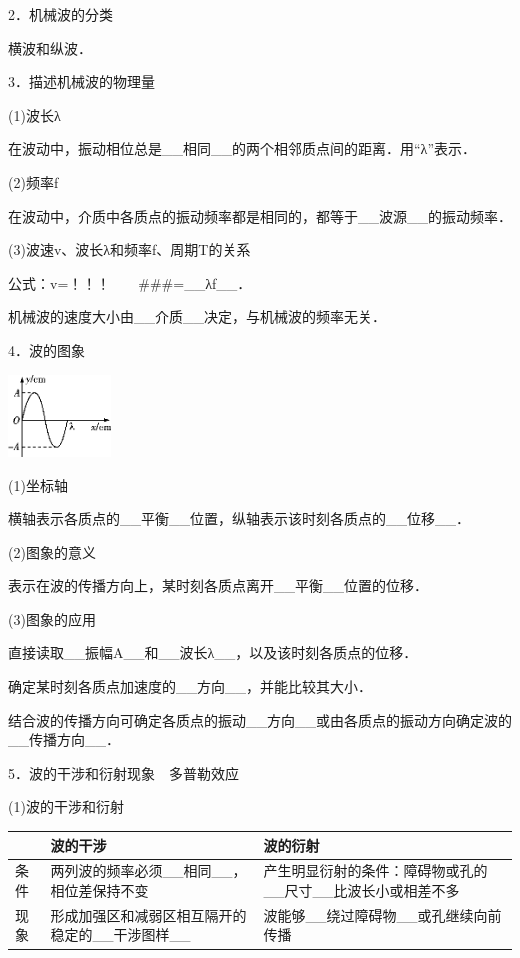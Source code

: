 2．机械波的分类

横波和纵波．

3．描述机械波的物理量

(1)波长λ

在波动中，振动相位总是\_\_相同\_\_的两个相邻质点间的距离．用``λ''表示．

(2)频率f

在波动中，介质中各质点的振动频率都是相同的，都等于\_\_波源\_\_的振动频率．

(3)波速v、波长λ和频率f、周期T的关系

公式：v=！！！　　\#\#\#=\_\_λf\_\_．

机械波的速度大小由\_\_介质\_\_决定，与机械波的频率无关．

4．波的图象

\begin{center}\includegraphics[width=1.07569in,height=0.85833in]{media/image526.png}\end{center}
(1)坐标轴

横轴表示各质点的\_\_平衡\_\_位置，纵轴表示该时刻各质点的\_\_位移\_\_．

(2)图象的意义

表示在波的传播方向上，某时刻各质点离开\_\_平衡\_\_位置的位移．

(3)图象的应用

直接读取\_\_振幅A\_\_和\_\_波长λ\_\_，以及该时刻各质点的位移．

确定某时刻各质点加速度的\_\_方向\_\_，并能比较其大小．

结合波的传播方向可确定各质点的振动\_\_方向\_\_或由各质点的振动方向确定波的\_\_传播方向\_\_．

5．波的干涉和衍射现象　多普勒效应

(1)波的干涉和衍射

\begin{longtable}[]{@{}lll@{}}
\toprule
& 波的干涉 & 波的衍射\tabularnewline
\midrule
\endhead
条件 & 两列波的频率必须\_\_相同\_\_，相位差保持不变 &
产生明显衍射的条件：障碍物或孔的\_\_尺寸\_\_比波长小或相差不多\tabularnewline
现象 & 形成加强区和减弱区相互隔开的稳定的\_\_干涉图样\_\_ &
波能够\_\_绕过障碍物\_\_或孔继续向前传播\tabularnewline
\bottomrule
\end{longtable}

